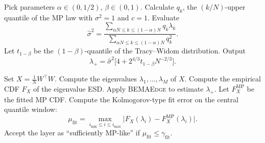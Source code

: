 \documentclass[11pt]{article}
\theoremstyle{plain}
\theoremstyle{definition}
\theoremstyle{remark}
\newcommand{\1}{\mathbf{1}}
\begin{document}
\begin{algorithm}[H]
\caption{Computing \(\lambda_+\) using MP and Tracy--Widom corrections}
\label{BEMA_algo}
\begin{algorithmic}[1]
\State Pick parameters \(\alpha\in(0,1/2)\), \(\beta\in(0,1)\).
    \State Calculate \(q_k\), the \((k/N)\)-upper quantile of the MP law with \(\sigma^2=1\) and \(c=1\).
\EndFor
\State Evaluate
\[
\widehat{\sigma}^2
=
\frac{\sum_{\alpha N\le k\le (1-\alpha)N} q_k\lambda_k}
     {\sum_{\alpha N\le k\le (1-\alpha)N} q_k^2}.
\]
\State Let \(t_{1-\beta}\) be the \((1-\beta)\)-quantile of the Tracy--Widom distribution.
\State Output
\[
\lambda_+
=
\widehat{\sigma}^2
\big[4+2^{4/3}t_{1-\beta}N^{-2/3}\big].
\]
\EndProcedure
\end{algorithmic}
\end{algorithm}

\begin{algorithm}[H]
\caption{Spectral analysis using a BEMA-type fit}
\label{algo:bema_fit}
\begin{algorithmic}[1]
\State Set \(X=\frac1N W^\top W\).
\State Compute the eigenvalues \(\lambda_1,\dots,\lambda_M\) of \(X\).
\State Compute the empirical CDF \(F_X\) of the eigenvalue ESD.
\State Apply \textsc{BEMAEdge} to estimate \(\lambda_+\).
\State Let \(F_X^{\mathrm{MP}}\) be the fitted MP CDF.
\State Compute the Kolmogorov-type fit error on the central quantile window:
\[
\mu_{\mathrm{fit}}
=
\max_{i_{\min}\le i\le i_{\max}}
\big|F_X(\lambda_i)-F_X^{\mathrm{MP}}(\lambda_i)\big|.
\]
\State Accept the layer as ``sufficiently MP-like'' if \(\mu_{\mathrm{fit}}\le \gamma_{\mathrm{fit}}\).
\EndProcedure
\end{algorithmic}
\end{algorithm}
\end{document}
